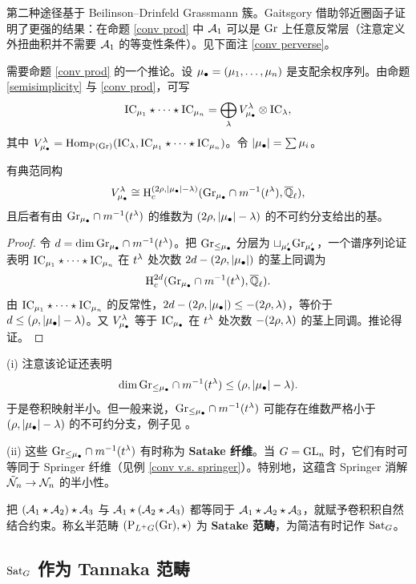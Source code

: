 第二种途径基于 Beilinson--Drinfeld Grassmann 簇。Gaitsgory 借助邻近圈函子证明了更强的结果：在命题 \ref{conv prod} 中 $\mA_1$ 可以是 $\Gr$ 上任意反常层（注意定义外扭曲积并不需要 $\mA_1$ 的等变性条件）。见下面注 \ref{conv perverse}。

需要命题 \ref{conv prod} 的一个推论。设 $\mmu=(\mu_1,\ldots,\mu_n)$ 是支配余权序列。由命题 \ref{semisimplicity} 与 \ref{conv prod}，可写
\[\IC_{\mu_1}\star\cdots\star\IC_{\mu_n}=\bigoplus_{\la} V_{\mmu}^\la\otimes \IC_\la,\]
其中 $V_{\mmu}^\la=\Hom_{\on{P}(\Gr)}(\IC_\la, \IC_{\mu_1}\star\cdots\star\IC_{\mu_n})$。令 $|\mmu|=\sum \mu_i$。

\begin{cor}\label{Satake fiber}
有典范同构
\[V_{\mmu}^\la\cong \on{H}^{(2\rho,|\mmu|-\la)}_c(\Gr_{\mmu}\cap m^{-1}(t^\la),\Ql),\]
且后者有由 $\Gr_{\mmu}\cap m^{-1}(t^\la)$ 的维数为 $(2\rho,|\mmu|-\la)$ 的不可约分支给出的基。
\end{cor}

\begin{proof}
令 $d=\dim \Gr_{\mmu}\cap m^{-1}(t^\la)$。把 $\Gr_{\leq \mu_\bullet}$ 分层为 $\sqcup_{\mu'_\bullet}\Gr_{\mu'_\bullet}$，一个谱序列论证表明 $\IC_{\mu_1}\star\cdots\star\IC_{\mu_n}$ 在 $t^\la$ 处次数 $2d- (2\rho,|\mmu|)$ 的茎上同调为
\[\on{H}^{2d}_c(\Gr_{\mmu}\cap m^{-1}(t^\la),\Ql).\]
由 $\IC_{\mu_1}\star\cdots\star\IC_{\mu_n}$ 的反常性，$2d- (2\rho,|\mmu|)\leq -(2\rho,\la)$，等价于 $d\leq (\rho,|\mmu|-\la)$。又 $V_{\mmu}^\la$ 等于 $\IC_{\mmu}$ 在 $t^\la$ 处次数 $-(2\rho,\la)$ 的茎上同调。推论得证。
\end{proof}

\begin{rmk}\label{semismall}
(i) 注意该论证还表明
\[\dim  \Gr_{\leq \mmu}\cap m^{-1}(t^{\la})\leq (\rho,|\mmu|-\la).\]
于是卷积映射半小。但一般来说，$\Gr_{\leq \mmu}\cap m^{-1}(t^{\la})$ 可能存在维数严格小于 $(\rho,|\mmu|-\la)$ 的不可约分支，例子见 \cite[Remark 4.3, 8.3]{Ha}。

(ii) 这些 $\Gr_{\leq \mmu}\cap m^{-1}(t^{\la})$ 有时称为 \textbf{Satake 纤维}。当 $G=\GL_n$ 时，它们有时可等同于 Springer 纤维（见例 \ref{conv v.s. springer}）。特别地，这蕴含 Springer 消解 $\tilde\mN_n\to \mN_n$ 的半小性。
\end{rmk}

把 $(\mA_1\star\mA_2)\star\mA_3$ 与 $\mA_1\star(\mA_2\star\mA_3)$ 都等同于 $\mA_1\star\mA_2\star\mA_3$，就赋予卷积积自然结合约束。称幺半范畴 $(\on{P}_{L^+G}(\Gr),\star)$ 为 \textbf{Satake 范畴}，为简洁有时记作 $\Sat_G$。

\subsection{$\Sat_G$ 作为 Tannaka 范畴}\label{mon str of H}


